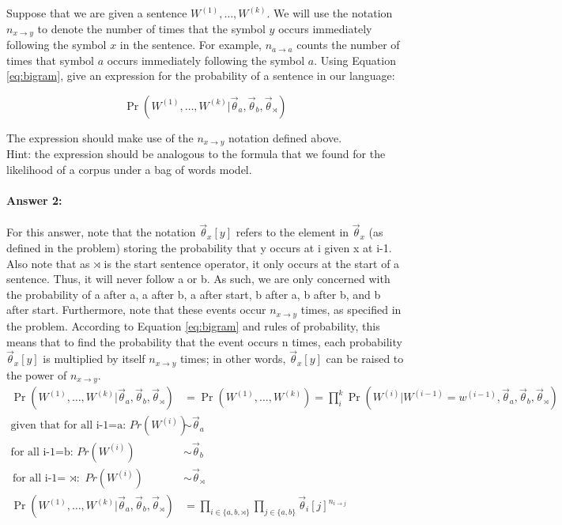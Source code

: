\documentclass[10pt]{article}
\begin{document}
\noindent Suppose that we are given a sentence $W^{(1)},\dots,W^{(k)}$. We will
use the notation $n_{x \rightarrow y}$ to denote the number of times
that the symbol $y$ occurs immediately following the symbol $x$ in the
sentence. For example, $n_{a \rightarrow a}$ counts the number of
times that symbol $a$ occurs immediately following the symbol $a$.
Using Equation \ref{eq:bigram}, give an expression for the probability
of a sentence in our language:

\begin{equation*}
\Pr(W^{(1)},\dots,W^{(k)} | \vec{\theta}_{a}, \vec{\theta}_{b}, \vec{\theta}_{\rtimes})
\end{equation*}

\noindent The expression should make use of the $n_{x \rightarrow y}$ notation
defined above.\\

\noindent Hint: the expression should be analogous to the formula that we found
for the likelihood of a corpus under a bag of words model.

\paragraph{Answer 2:} For this answer, note that the notation $\vec{\theta}_x[y]$ refers to the element in $\vec{\theta}_x$ (as defined in the problem) storing the probability that y occurs at i given x at i-1. Also note that as $\rtimes$ is the start sentence operator, it only occurs at the start of a sentence. Thus, it will never follow a or b. As such, we are only concerned with the probability of a after a, a after b, a after start, b after a, b after b, and b after start.\newline
Furthermore, note that these events occur $n_{x \rightarrow y}$ times, as specified in the problem. According to Equation \ref{eq:bigram} and rules of probability, this means that to find the probability that the event occurs n times, each probability $\vec{\theta}_x[y]$ is multiplied by itself $n_{x \rightarrow y}$ times; in other words, $\vec{\theta}_x[y]$ can be raised to the power of $n_{x \rightarrow y}$.
\begin{equation*}
    \begin{split}
        \Pr(W^{(1)},\dots,W^{(k)} | \vec{\theta}_{a}, \vec{\theta}_{b}, \vec{\theta}_{\rtimes}) &=
        \Pr(W^{(1)},\dots,W^{(k)})=\prod_i^k \Pr(W^{(i)} | W^{(i-1)}=w^{(i-1)}, \vec{\theta}_{a}, \vec{\theta}_{b}, \vec{\theta}_{\rtimes})\\
        \text{given that for all i-1=a: } Pr(W^{(i)}) &\sim \vec{\theta}_{a}\\
        \text{for all i-1=b: } Pr(W^{(i)}) &\sim \vec{\theta}_{b}\\
        \text{for all i-1= $\rtimes$: } Pr(W^{(i)}) &\sim \vec{\theta}_{\rtimes}\\
        \Pr(W^{(1)},\dots,W^{(k)} | \vec{\theta}_{a}, \vec{\theta}_{b}, \vec{\theta}_{\rtimes}) &=
        \prod_{i \in \{a,b,\rtimes\}} \prod_{j \in \{a,b\}} \vec{\theta}_{i}[j]^{n_{i \rightarrow j}}
    \end{split}
\end{equation*}
\end{document}
